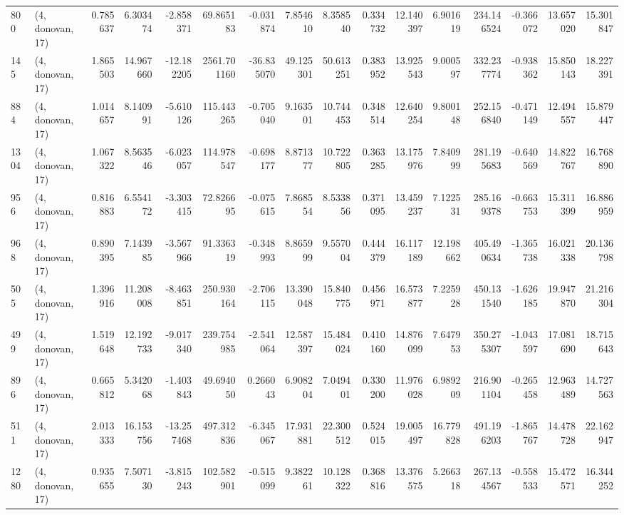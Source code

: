 \begin{tabular}{llrrrrrrrrrrrrrr}
800  &  (4, donovan, 17) &   0.785637 &   6.303474 &  -2.858371 &     69.865183 &   -0.031874 &    7.854610 &    8.358540 &  0.334732 &  12.140397 &   6.901619 &   234.146524 &  -0.366072 &  13.657020 &  15.301847 \\
145  &  (4, donovan, 17) &   1.865503 &  14.967660 & -12.182205 &   2561.701160 &  -36.835070 &   49.125301 &   50.613251 &  0.383952 &  13.925543 &   9.000597 &   332.237774 &  -0.938362 &  15.850143 &  18.227391 \\
884  &  (4, donovan, 17) &   1.014657 &   8.140991 &  -5.610126 &    115.443265 &   -0.705040 &    9.163501 &   10.744453 &  0.348514 &  12.640254 &   9.800148 &   252.156840 &  -0.471149 &  12.494557 &  15.879447 \\
1304 &  (4, donovan, 17) &   1.067322 &   8.563546 &  -6.023057 &    114.978547 &   -0.698177 &    8.871377 &   10.722805 &  0.363285 &  13.175976 &   7.840999 &   281.195683 &  -0.640569 &  14.822767 &  16.768890 \\
956  &  (4, donovan, 17) &   0.816883 &   6.554172 &  -3.303415 &     72.826695 &   -0.075615 &    7.868554 &    8.533856 &  0.371095 &  13.459237 &   7.122531 &   285.169378 &  -0.663753 &  15.311399 &  16.886959 \\
968  &  (4, donovan, 17) &   0.890395 &   7.143985 &  -3.567966 &     91.336319 &   -0.348993 &    8.865999 &    9.557004 &  0.444379 &  16.117189 &  12.198662 &   405.490634 &  -1.365738 &  16.021338 &  20.136798 \\
505  &  (4, donovan, 17) &   1.396916 &  11.208008 &  -8.463851 &    250.930164 &   -2.706115 &   13.390048 &   15.840775 &  0.456971 &  16.573877 &   7.225928 &   450.131540 &  -1.626185 &  19.947870 &  21.216304 \\
499  &  (4, donovan, 17) &   1.519648 &  12.192733 &  -9.017340 &    239.754985 &   -2.541064 &   12.587397 &   15.484024 &  0.410160 &  14.876099 &   7.647953 &   350.275307 &  -1.043597 &  17.081690 &  18.715643 \\
896  &  (4, donovan, 17) &   0.665812 &   5.342068 &  -1.403843 &     49.694050 &    0.266043 &    6.908204 &    7.049401 &  0.330200 &  11.976028 &   6.989209 &   216.901104 &  -0.265458 &  12.963489 &  14.727563 \\
511  &  (4, donovan, 17) &   2.013333 &  16.153756 & -13.257468 &    497.312836 &   -6.345067 &   17.931881 &   22.300512 &  0.524015 &  19.005497 &  16.779828 &   491.196203 &  -1.865767 &  14.478728 &  22.162947 \\
1280 &  (4, donovan, 17) &   0.935655 &   7.507130 &  -3.815243 &    102.582901 &   -0.515099 &    9.382261 &   10.128322 &  0.368816 &  13.376575 &   5.266318 &   267.134567 &  -0.558533 &  15.472571 &  16.344252 \\

\end{tabular}
